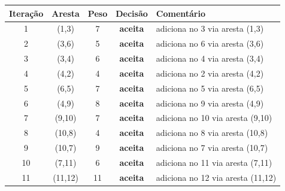 \begin{footnotesize}
\begin{longtable}{c c c c p{5.5cm}}
\toprule
Itera\c{c}\~ao & Aresta & Peso & Decis\~ao & Coment\'ario \\
\midrule
\endhead
1 & (1,3) & 7 & \textbf{aceita} & adiciona no 3 via aresta (1,3) \\
2 & (3,6) & 5 & \textbf{aceita} & adiciona no 6 via aresta (3,6) \\
3 & (3,4) & 6 & \textbf{aceita} & adiciona no 4 via aresta (3,4) \\
4 & (4,2) & 4 & \textbf{aceita} & adiciona no 2 via aresta (4,2) \\
5 & (6,5) & 7 & \textbf{aceita} & adiciona no 5 via aresta (6,5) \\
6 & (4,9) & 8 & \textbf{aceita} & adiciona no 9 via aresta (4,9) \\
7 & (9,10) & 7 & \textbf{aceita} & adiciona no 10 via aresta (9,10) \\
8 & (10,8) & 4 & \textbf{aceita} & adiciona no 8 via aresta (10,8) \\
9 & (10,7) & 9 & \textbf{aceita} & adiciona no 7 via aresta (10,7) \\
10 & (7,11) & 6 & \textbf{aceita} & adiciona no 11 via aresta (7,11) \\
11 & (11,12) & 11 & \textbf{aceita} & adiciona no 12 via aresta (11,12) \\
\bottomrule
\end{longtable}
\end{footnotesize}
